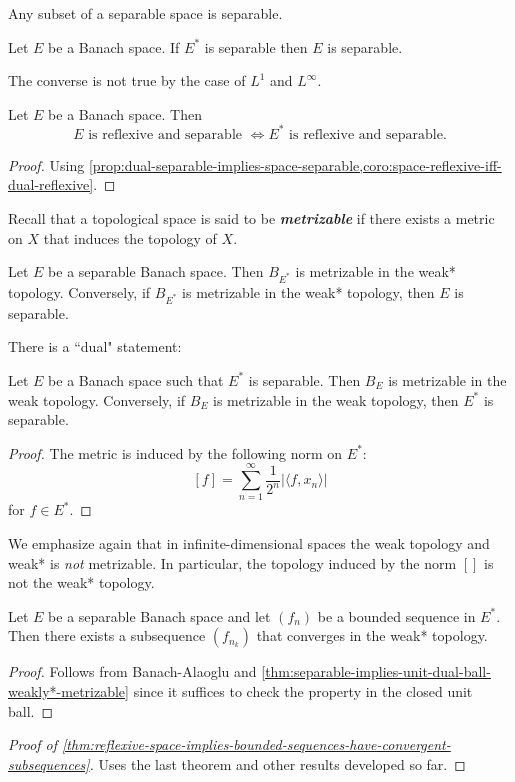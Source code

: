 \documentclass{article}
\theoremstyle{definition}
\numberwithin{equation}{section}
\begin{document}
\begin{prop}
	Any subset of a separable space is separable.
\end{prop}
\begin{prop}\label{prop:dual-separable-implies-space-separable}
	Let $E$ be a Banach space. If $E^*$ is separable then $E$ is separable.
\end{prop}
\begin{remark}
	The converse is not true by the case of $L^1$ and $L^\infty$.
\end{remark}
\begin{coro}
	Let $E$ be a Banach space. Then
	\[E \text{ is reflexive and separable }\iff E^*\text{ is reflexive and separable}.\]
\end{coro}
\begin{proof}
	Using \cref{prop:dual-separable-implies-space-separable,coro:space-reflexive-iff-dual-reflexive}.
\end{proof}
Recall that a topological space is said to be \textbf{\textit{metrizable}} if there exists a metric on $X$ that induces the topology of $X$.

\begin{thm}\label{thm:separable-implies-unit-dual-ball-weakly*-metrizable}
	Let $E$ be a separable Banach space. Then $B_{E^*}$ is metrizable in the weak* topology. Conversely, if $B_{E^*}$ is metrizable in the weak* topology, then $E$ is separable.
\end{thm}
There is a ``dual" statement:
\begin{thm}
	Let $E$ be a Banach space such that $E^*$ is separable. Then $B_E$ is metrizable in the weak topology. Conversely, if $B_E$ is metrizable in the weak topology,  then $E^*$ is separable.
\end{thm}
\begin{proof}
	The metric is induced by the following norm on $E^*$:
	\[[f]=\sum_{n=1}^\infty\frac{1}{2^n}|\langle f,x_n\rangle|\]
	for $f\in E^*$.
\end{proof}
\begin{remark}
	We emphasize again that in infinite-dimensional spaces the weak topology and weak* is \textit{not} metrizable. In particular, the topology induced by the norm $[ ]$ is not the weak* topology.
\end{remark}
\begin{coro}
	Let $E$ be a separable Banach space and let $(f_n)$ be a bounded sequence in $E^*$. Then there exists a subsequence $(f_{n_k})$ that converges in the weak* topology.
\end{coro}
\begin{proof}
	Follows from Banach-Alaoglu and \cref{thm:separable-implies-unit-dual-ball-weakly*-metrizable} since it suffices to check the property in the closed unit ball.
\end{proof}
\begin{proof}[Proof of \cref{thm:reflexive-space-implies-bounded-sequences-have-convergent-subsequences}]\label{proof:eflexive-space-implies-bounded-sequences-have-convergent-subsequences} {\color{orange} Uses the last theorem and other results developed so far.}
\end{proof}
\end{document}
